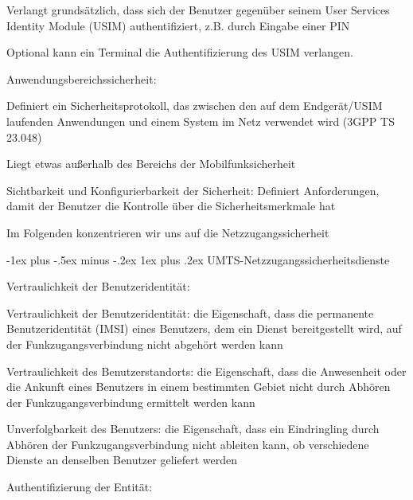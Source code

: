 \documentclass[a4paper]{article}
\makeatletter
\renewcommand{\subsubsection}{\@startsection{subsubsection}{3}{0mm}%
 {-1ex plus -.5ex minus -.2ex}%
 {1ex plus .2ex}%
 {\normalfont\small\bfseries}}
\makeatother
\begin{document}
\begin{multicols}{3}
\begin{itemize*}
            \begin{itemize*}
                  \item Verlangt grundsätzlich, dass sich der Benutzer gegenüber seinem User Services Identity Module (USIM) authentifiziert, z.B. durch Eingabe einer PIN
                  \item Optional kann ein Terminal die Authentifizierung des USIM verlangen.
            \end{itemize*}
            \item
            Anwendungsbereichssicherheit:

            \begin{itemize*}
                  \item Definiert ein Sicherheitsprotokoll, das zwischen den auf dem Endgerät/USIM laufenden Anwendungen und einem System im Netz verwendet wird (3GPP TS 23.048)
                  \item Liegt etwas außerhalb des Bereichs der Mobilfunksicherheit
            \end{itemize*}
            \item
            Sichtbarkeit und Konfigurierbarkeit der Sicherheit: Definiert
            Anforderungen, damit der Benutzer die Kontrolle über die
            Sicherheitsmerkmale hat
            \item
            Im Folgenden konzentrieren wir uns auf die Netzzugangssicherheit
      \end{itemize*}


      \subsubsection{UMTS-Netzzugangssicherheitsdienste}

      \begin{itemize*}
            \item
            Vertraulichkeit der Benutzeridentität:

            \begin{itemize*}
                  \item Vertraulichkeit der Benutzeridentität: die Eigenschaft, dass die permanente Benutzeridentität (IMSI) eines Benutzers, dem ein Dienst bereitgestellt wird, auf der Funkzugangsverbindung nicht abgehört werden kann
                  \item Vertraulichkeit des Benutzerstandorts: die Eigenschaft, dass die Anwesenheit oder die Ankunft eines Benutzers in einem bestimmten Gebiet nicht durch Abhören der Funkzugangsverbindung ermittelt werden kann
                  \item Unverfolgbarkeit des Benutzers: die Eigenschaft, dass ein Eindringling durch Abhören der Funkzugangsverbindung nicht ableiten kann, ob verschiedene Dienste an denselben Benutzer geliefert werden
            \end{itemize*}
            \item
            Authentifizierung der Entität:


\end{itemize*}
\end{multicols}
\end{document}
